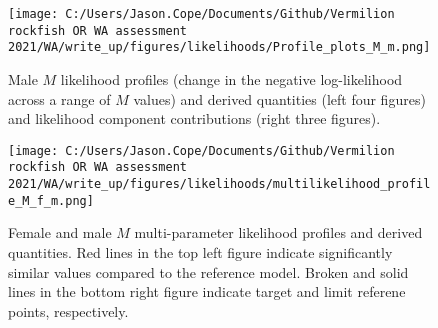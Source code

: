 \documentclass[11pt,
  english,
  a4paper,
]{article}
\begin{document}
\tagmcend\tagstructend


\begin{figure}
\centering
\texttt{[image: C:/Users/Jason.Cope/Documents/Github/Vermilion rockfish OR WA assessment 2021/WA/write\_up/figures/likelihoods/Profile\_plots\_M\_m.png]}
\caption{Male {\(M\)\leavevmode\tagmcend\tagstructend} likelihood profiles (change in the negative log-likelihood across a range of {\(M\)\leavevmode\tagmcend\tagstructend} values) and derived quantities (left four figures) and likelihood component contributions (right three figures).\label{fig:M_m-profile-combo}}
\end{figure}

\tagmcend\tagstructend


\begin{figure}
\centering
\texttt{[image: C:/Users/Jason.Cope/Documents/Github/Vermilion rockfish OR WA assessment 2021/WA/write\_up/figures/likelihoods/multilikelihood\_profile\_M\_f\_m.png]}
\caption{Female and male {\(M\)\leavevmode\tagmcend\tagstructend} multi-parameter likelihood profiles and derived quantities. Red lines in the top left figure indicate significantly similar values compared to the reference model. Broken and solid lines in the bottom right figure indicate target and limit referene points, respectively.\label{fig:M-multiprofile-combo}}
\end{figure}

\tagmcend\tagstructend

\end{document}
